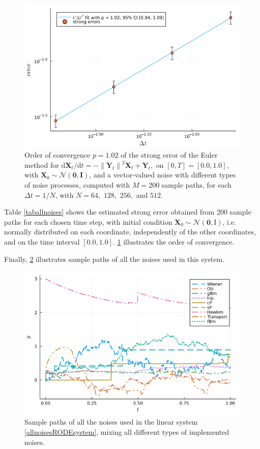 \documentclass[reqno,12pt]{amsart}
\theoremstyle{plain} %
\theoremstyle{definition} %
\begin{document}
\begin{figure}[htb]
    \includegraphics[scale=0.4]{img/order_allnoises.png}
    \caption{Order of convergence $p = 1.02$ of the strong error of the Euler method for $\mathrm{d}\mathbf{X}_t/\mathrm{d}t = - \left\|\mathbf{Y}_t\right\|^2 \mathbf{X}_t + \mathbf{Y}_t,$ on $[0, T] = [0.0, 1.0]$, with $\mathbf{X}_0 \sim \mathcal{N}(\mathbf{0}, \mathbf{I})$, and a vector-valued noise with different types of noise processes, computed with $M = 200$ sample paths, for each $\Delta t = 1/N$, with $N = 64,$ $128,$ $256,$ and $512.$}
    \label{figallnoises}
\end{figure}

Table \ref{taballnoises} shows the estimated strong error obtained from 200 sample paths for each chosen time step, with initial condition $\mathbf{X}_0 \sim \mathcal{N}(\mathbf{0}, \mathrm{I})$, i.e. normally distributed on each coordinate, independently of the other coordinates, and on the time interval $[0.0, 1.0]$. \cref{figallnoises} illustrates the order of convergence.

Finally, \cref{figsamplepathsallnoises} illustrates sample paths of all the noises used in this system.

\begin{figure}[htb]
    \includegraphics[scale=0.4]{img/noisepath_allnoises.png}
    \caption{Sample paths of all the noises used in the linear system \eqref{allnoisesRODEsystem}, mixing all different types of implemented noises.}
    \label{figsamplepathsallnoises}
\end{figure}
\end{document}
